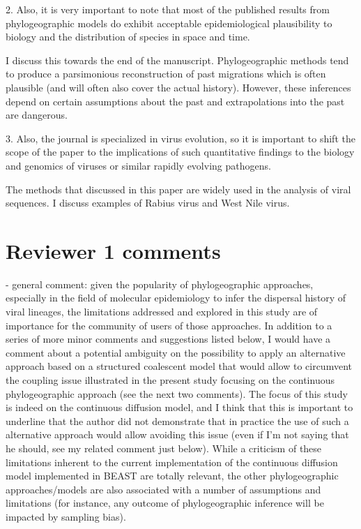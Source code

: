 \documentclass[11pt, oneside]{article}   	%
\newcommand{\response}[1]{{\color{black}{\bf Response:} #1}}
\begin{document}
2. Also, it is very important to note that most of the published results from phylogeographic models do exhibit acceptable epidemiological plausibility to biology and the distribution of species in space and time.

\response{I discuss this towards the end of the manuscript. Phylogeographic methods tend to produce a parsimonious reconstruction of past migrations which is often plausible (and will often also cover the actual history). However, these inferences depend on certain assumptions about the past and extrapolations into the past are dangerous. }

3. Also, the journal is specialized in virus evolution, so it is important to shift the scope of the paper to the implications of such quantitative findings to the biology and genomics of viruses or similar rapidly evolving pathogens.

\response{The methods that discussed in this paper are widely used in the analysis of viral sequences. I discuss examples of Rabius virus and West Nile virus. }


\section*{Reviewer 1 comments}
- general comment: given the popularity of phylogeographic approaches, especially in the field of molecular epidemiology to infer the dispersal history of viral lineages, the limitations addressed and explored in this study are of importance for the community of users of those approaches. In addition to a series of more minor comments and suggestions listed below, I would have a comment about a potential ambiguity on the possibility to apply an alternative approach based on a structured coalescent model that would allow to circumvent the coupling issue illustrated in the present study focusing on the continuous phylogeographic approach (see the next two comments). The focus of this study is indeed on the continuous diffusion model, and I think that this is important to underline that the author did not demonstrate that in practice the use of such a alternative approach would allow avoiding this issue (even if I'm not saying that he should, see my related comment just below). While a criticism of these limitations inherent to the current implementation of the continuous diffusion model implemented in BEAST are totally relevant, the other phylogeographic approaches/models are also associated with a number of assumptions and limitations (for instance, any outcome of phylogeographic inference will be impacted by sampling bias).
\end{document}
